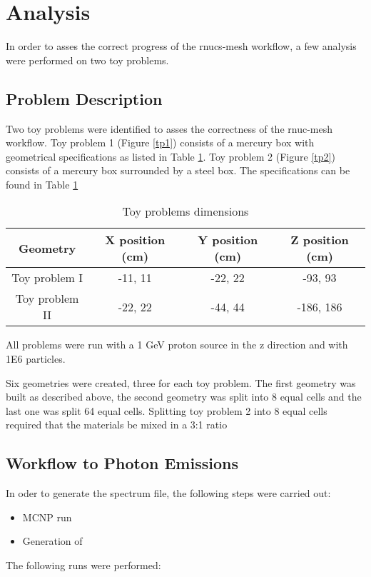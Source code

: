\section{Analysis}\label{sc:analysis}
In order to asses the correct progress of the rnucs-mesh workflow, a few 
analysis were performed on two toy problems. 

\subsection{Problem Description}
Two toy problems were identified to asses the correctness of the 
rnuc-mesh workflow. 
Toy problem 1 (Figure \ref{tp1}) consists of a mercury box with geometrical specifications as 
listed in Table \ref{tab:geom_dim}. 
Toy problem 2 (Figure \ref{tp2}) consists of a mercury box surrounded by a steel box. The 
specifications can be found in Table \ref{tab:geom_dim}


\begin{table}[ht]
\begin{centering}
\begin{tabular}{|c|c|c|c|}
  \hline
  Geometry       & X position (cm) & Y position (cm) & Z position (cm) \\
  \hline  \hline
  Toy problem I  & -11, 11         & -22, 22         & -93, 93         \\
  \hline
  Toy problem II  & -22, 22         & -44, 44         & -186, 186       \\
  \hline
\end{tabular}
\caption{Toy problems dimensions}
\label{tab:geom_dim}
\end{centering}
\end{table}

All problems were run with a 1 GeV proton source in the z direction and 
with 1E6 particles. 

Six geometries were created, three for each toy problem. 
The first geometry was built as  described above, the second geometry 
was split into 8 equal cells and the last one was split 64 equal cells. 
Splitting toy problem 2 into 8 equal cells required that the materials 
be mixed in a 3:1 ratio


\subsection{Workflow to Photon Emissions}

In oder to generate the spectrum file, the following steps were carried out:
\begin{itemize}
\item MCNP run 
\item Generation of 
\end{itemize}
The following runs were performed:

